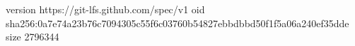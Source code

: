 version https://git-lfs.github.com/spec/v1
oid sha256:0a7e74a23b76c7094305c55f6c03760b54827ebbdbbd50f1f5a06a240ef35dde
size 2796344

